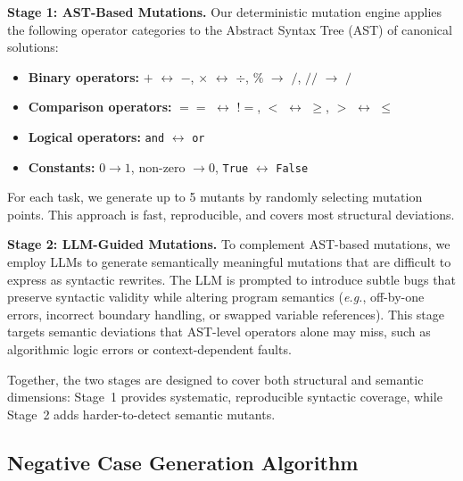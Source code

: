 
\textbf{Stage 1: AST-Based Mutations.}
Our deterministic mutation engine applies the following operator categories to the Abstract Syntax Tree (AST) of canonical solutions:
\begin{itemize}[leftmargin=*,nosep]
    \item \textbf{Binary operators:} $+$ $\leftrightarrow$ $-$, $\times$ $\leftrightarrow$ $\div$, $\%$ $\to$ $/$, $//$ $\to$ $/$
    \item \textbf{Comparison operators:} $==$ $\leftrightarrow$ $!=$, $<$ $\leftrightarrow$ $\geq$, $>$ $\leftrightarrow$ $\leq$
    \item \textbf{Logical operators:} \texttt{and} $\leftrightarrow$ \texttt{or}
    \item \textbf{Constants:} $0 \to 1$, non-zero $\to 0$, \texttt{True} $\leftrightarrow$ \texttt{False}
\end{itemize}
For each task, we generate up to 5 mutants by randomly selecting mutation points. This approach is fast, reproducible, and covers most structural deviations.

\textbf{Stage 2: LLM-Guided Mutations.}
To complement AST-based mutations, we employ LLMs to generate semantically meaningful mutations that are difficult to express as syntactic rewrites. The LLM is prompted to introduce subtle bugs that preserve syntactic validity while altering program semantics (\emph{e.g.}, off-by-one errors, incorrect boundary handling, or swapped variable references). This stage targets semantic deviations that AST-level operators alone may miss, such as algorithmic logic errors or context-dependent faults.

Together, the two stages are designed to cover both structural and semantic dimensions: Stage~1 provides systematic, reproducible syntactic coverage, while Stage~2 adds harder-to-detect semantic mutants. 

\subsection{Negative Case Generation Algorithm}

